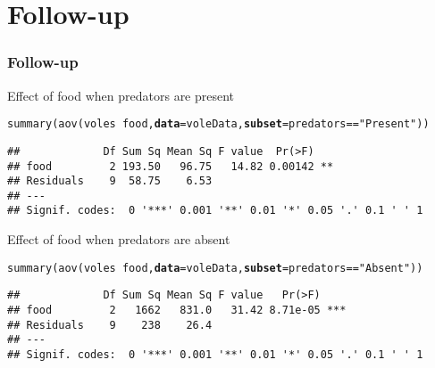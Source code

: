 \documentclass[color=usenames,dvipsnames]{beamer}\usepackage[]{graphicx}\usepackage[]{color}
\makeatletter
\newcommand{\hlstr}[1]{\textcolor[rgb]{0.749,0.012,0.012}{#1}}%
\newcommand{\hlopt}[1]{\textcolor[rgb]{0,0,0}{#1}}%
\newcommand{\hlstd}[1]{\textcolor[rgb]{0,0,0}{#1}}%
\newcommand{\hlkwc}[1]{\textcolor[rgb]{0,0,0}{\textbf{#1}}}%
\newcommand{\hlkwd}[1]{\textcolor[rgb]{0.004,0.004,0.506}{#1}}%
\newenvironment{kframe}{%
 \def\at@end@of@kframe{}%
 \ifinner\ifhmode%
  \def\at@end@of@kframe{\end{minipage}}%
  \begin{minipage}{\columnwidth}%
 \fi\fi%
 \def\FrameCommand##1{\hskip\@totalleftmargin \hskip-\fboxsep
 \colorbox{shadecolor}{##1}\hskip-\fboxsep
     \hskip-\linewidth \hskip-\@totalleftmargin \hskip\columnwidth}%
 \MakeFramed {\advance\hsize-\width
   \@totalleftmargin\z@ \linewidth\hsize
   \@setminipage}}%
 {\par\unskip\endMakeFramed%
 \at@end@of@kframe}
\newenvironment{knitrout}{}{} %
\makeatother
\begin{document}
\section{Follow-up}





\begin{frame}[fragile]
  \frametitle{Follow-up}
  \footnotesize
  Effect of food when predators are present
\begin{knitrout}\small
{}\color{fgcolor}\begin{kframe}
\begin{alltt}
\hlkwd{summary}\hlstd{(}\hlkwd{aov}\hlstd{(voles} \hlopt{~} \hlstd{food,} \hlkwc{data}\hlstd{=voleData,} \hlkwc{subset}\hlstd{=predators}\hlopt{==}\hlstr{"Present"}\hlstd{))}
\end{alltt}
\begin{verbatim}
##             Df Sum Sq Mean Sq F value  Pr(>F)   
## food         2 193.50   96.75   14.82 0.00142 **
## Residuals    9  58.75    6.53                   
## ---
## Signif. codes:  0 '***' 0.001 '**' 0.01 '*' 0.05 '.' 0.1 ' ' 1
\end{verbatim}
\end{kframe}
\end{knitrout}
\pause
\vfill
  Effect of food when predators are absent
\begin{knitrout}\small
{}\color{fgcolor}\begin{kframe}
\begin{alltt}
\hlkwd{summary}\hlstd{(}\hlkwd{aov}\hlstd{(voles} \hlopt{~} \hlstd{food,} \hlkwc{data}\hlstd{=voleData,} \hlkwc{subset}\hlstd{=predators}\hlopt{==}\hlstr{"Absent"}\hlstd{))}
\end{alltt}
\begin{verbatim}
##             Df Sum Sq Mean Sq F value   Pr(>F)    
## food         2   1662   831.0   31.42 8.71e-05 ***
## Residuals    9    238    26.4                     
## ---
## Signif. codes:  0 '***' 0.001 '**' 0.01 '*' 0.05 '.' 0.1 ' ' 1
\end{verbatim}
\end{kframe}
\end{knitrout}
\end{frame}
\end{document}
